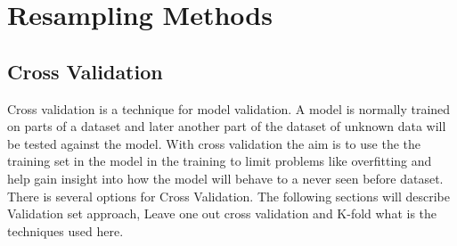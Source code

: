 \chapter{Resampling Methods}


\section{Cross Validation} \label{sc:crossValidation}
Cross validation is a technique for model validation. A model is normally trained on parts of a dataset and later another part of the dataset of unknown data will be tested against the model. With cross validation the aim is to use the the training set in the model in the training to limit problems like overfitting and help gain insight into how the model will behave to a never seen before dataset. There is several options for Cross Validation. The following sections will describe Validation set approach, Leave one out cross validation and K-fold what is the techniques used here.




